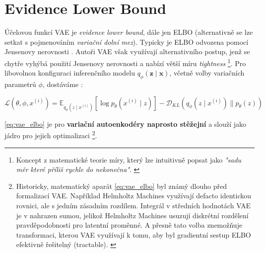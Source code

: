 \section{Evidence Lower Bound}
Účelovou funkcí VAE je \emph{evidence lower bound}, dále jen ELBO (alternativně se lze setkat s pojmenováním \emph{variační dolní mez}).
Typicky je ELBO odvozena pomocí Jensenovy nerovnosti \cite[Sekce 4.2]{Wasserman2013}.
Autoři VAE \cite{Kingma2014} však využívají alternativního postup, jenž se chytře vyhýbá použití Jensenovy nerovnosti a nabízí větší míru \emph{tightness}
\footnote{Koncept z matematické teorie míry, který lze intuitivně popsat jako \emph{"sadu měr které příliš rychle  do nekonečna"}. \cite{Topsoee1974}}. 
Pro libovolnou konfiguraci inferenčního modelu $q_\phi(\textbf{z}\mid\textbf{x})$, včetně volby variačních parametrů $\phi$, dostáváme \cite[Rovnice 3]{Kingma2014}:

\begin{equation}
    \label{eq:vae_elbo}
    \mathcal{L}(\theta,\phi,x^{(i)}) = \mathds{E}_{q_\phi(z\mid x^{(i)})} \left[ \log p_\theta(x^{(i)}\mid z) \right] - \mathcal{D}_{KL}(q_\phi(z\mid x^{(i)})\parallel p_\theta(z))
\end{equation}

\autoref{eq:vae_elbo} je pro \textbf{variační autoenkodéry naprosto stěžejní} a slouží jako jádro pro jejich optimalizaci
\footnote{Historicky, matematický aparát \autoref{eq:vae_elbo} byl známý dlouho před formalizací VAE. Například Helmholtz Machines \cite{Dayan1995} využívají defacto identickou rovnici, ale s jedním zásadním rozdílem. Integrál v středních hodnotách VAE je v \cite[Rovnice 5]{Dayan1995} nahrazen sumou, jelikož Helmholtz Machines usuzují diskrétní rozdělení pravděpodobnosti pro latentní proměnné. A přesně tato volba znemožňuje transformaci, kterou VAE využívají k tomu, aby byl gradientní sestup ELBO efektivně řešitelný (tractable). \cite{Doersch2021}}. \cite{Doersch2021}

